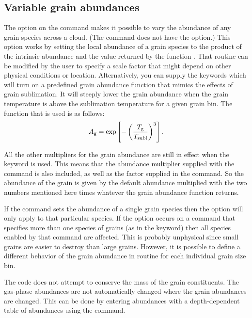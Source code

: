 \subsection{Variable grain abundances}

The  option on the  command
makes it possible to vary the
abundance of any grain species across a cloud.
(The  command
does not have the  option.)
This option works by setting the local
abundance of a grain species to the product of the intrinsic abundance and
the value returned by the function .
That routine can be modified
by the user to specify a scale factor that might depend on other
physical conditions or location.
Alternatively, you can supply the keywords 
which will turn on a predefined grain abundance function that mimics
the effects of grain sublimation. It will steeply lower the grain abundance
when the grain temperature is above the sublimation temperature for a given
grain bin. The function that is used is as follows:
\[ A_{\rm g} = \exp \left[ - \left( \frac{T_{\rm g}}{T_{\rm subl}} \right)^3 \right]. \]

All the other multipliers for the grain abundance
are still in effect when the keyword  is used.
This means that
the abundance multiplier supplied with the  command
is also included,
as well as the factor supplied in the  command.
So the abundance of the grain is given by the default abundance
multiplied with the two numbers mentioned here times whatever
the grain abundance function returns.

If the  command sets the abundance of
a single grain species then
the  option will only apply to
that particular species.
If the option occurs on a  command
that specifies more than one species of grains (as in the
 keyword) then all species enabled by that command
are affected.
This is probably unphysical since small grains are easier
to destroy than large grains.
However, it is possible to define a different
behavior of the grain abundance in routine 
for each individual grain size bin.

The code does not attempt to conserve the mass of
the grain constituents.
The gas-phase abundances are not automatically changed
where the grain abundances are changed.
This can be done by entering abundances with a depth-dependent
table of abundances using the  command.


